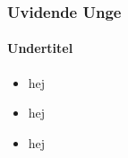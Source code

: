 
\begin{frame}
\frametitle{Uvidende Unge}
\framesubtitle{Undertitel} %
    \begin{itemize}
        \item{hej}
        \pause
        \item{hej}
        \pause
        \item{hej}
    \end{itemize}
\end{frame}

